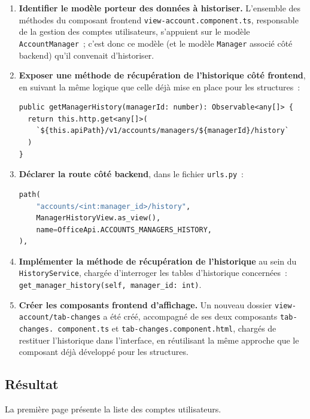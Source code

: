 \begin{enumerate}
  \item \textbf{Identifier le modèle porteur des données à historiser.}
        L'ensemble des méthodes du composant frontend
        \texttt{view-account.component.ts}, responsable de la gestion
        des comptes utilisateurs, s'appuient sur le modèle
        \texttt{AccountManager}~; c'est donc ce modèle (et le modèle
        \texttt{Manager} associé côté backend) qu'il convenait
        d'historiser.
  \item \textbf{Exposer une méthode de récupération de l'historique côté
        frontend}, en suivant la même logique que celle déjà mise en
        place pour les structures~:
\begin{lstlisting}[caption={Ajout dans \texttt{manager.service.ts}}]
public getManagerHistory(managerId: number): Observable<any[]> {
  return this.http.get<any[]>(
    `${this.apiPath}/v1/accounts/managers/${managerId}/history`
  )
}
\end{lstlisting}
  \item \textbf{Déclarer la route côté backend}, dans le fichier
        \texttt{urls.py}~:
\begin{lstlisting}[language=Python, caption={Ajout de la route dans \texttt{urls.py}}]
path(
    "accounts/<int:manager_id>/history",
    ManagerHistoryView.as_view(),
    name=OfficeApi.ACCOUNTS_MANAGERS_HISTORY,
),
\end{lstlisting}
  \item \textbf{Implémenter la méthode de récupération de l'historique}
        au sein du \texttt{HistoryService}, chargée d'interroger les
        tables d'historique concernées~:
        \texttt{get\_manager\_history(self, manager\_id: int)}.
  \item \textbf{Créer les composants frontend d'affichage.} Un nouveau
        dossier \texttt{view-account/tab-changes} a été créé,
        accompagné de ses deux composants \texttt{tab-changes.\allowbreak
        component.ts} et \texttt{tab-changes.component.html}, chargés de
        restituer l'historique dans l'interface, en réutilisant la même
        approche que le composant déjà développé pour les structures.
\end{enumerate}

\subsection{Résultat}

La première page présente la liste des comptes utilisateurs.

